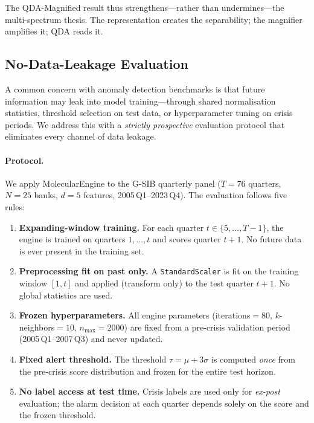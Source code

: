 \documentclass[journal]{IEEEtran}
\begin{document}
The QDA-Magnified result thus strengthens---rather than undermines---the multi-spectrum thesis. The representation creates the separability; the magnifier amplifies it; QDA reads it.

\subsection{No-Data-Leakage Evaluation}
\label{sec:no-leakage}

A common concern with anomaly detection benchmarks is that future information may leak into model training---through shared normalisation statistics, threshold selection on test data, or hyperparameter tuning on crisis periods.  We address this with a \emph{strictly prospective} evaluation protocol that eliminates every channel of data leakage.

\paragraph{Protocol.}
We apply MolecularEngine to the G-SIB quarterly panel ($T{=}76$ quarters, $N{=}25$ banks, $d{=}5$ features, 2005\,Q1--2023\,Q4).  The evaluation follows five rules:

\begin{enumerate}[label=(\roman*)]
  \item \textbf{Expanding-window training.}  For each quarter $t \in \{5, \ldots, T{-}1\}$, the engine is trained on quarters $1, \ldots, t$ and scores quarter $t{+}1$.  No future data is ever present in the training set.
  \item \textbf{Preprocessing fit on past only.}  A \texttt{StandardScaler} is fit on the training window $[1, t]$ and applied (transform only) to the test quarter $t{+}1$.  No global statistics are used.
  \item \textbf{Frozen hyperparameters.}  All engine parameters (iterations${}=80$, $k$-neighbors${}=10$, $n_{\mathrm{max}}=2000$) are fixed from a pre-crisis validation period (2005\,Q1--2007\,Q3) and never updated.
  \item \textbf{Fixed alert threshold.}  The threshold $\tau = \mu + 3\sigma$ is computed \emph{once} from the pre-crisis score distribution and frozen for the entire test horizon.
  \item \textbf{No label access at test time.}  Crisis labels are used only for \emph{ex-post} evaluation; the alarm decision at each quarter depends solely on the score and the frozen threshold.
\end{enumerate}
\end{document}

